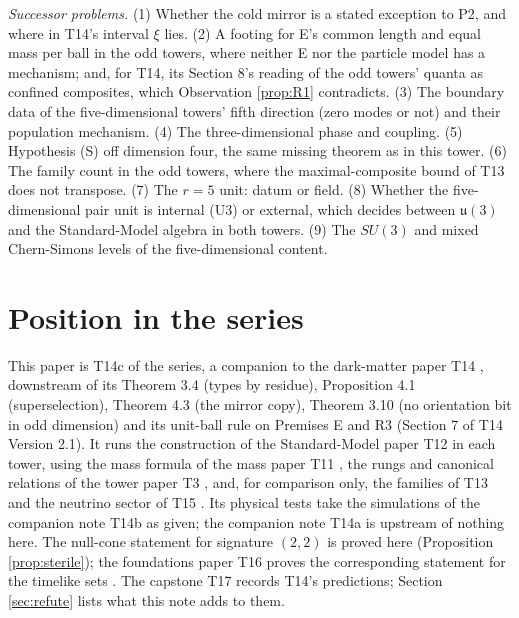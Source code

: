 \documentclass[11pt]{article}
\theoremstyle{definition}
\newcommand{\uu}{\mathfrak{u}}
\begin{document}
\emph{Successor problems.} (1) Whether the cold mirror is a stated exception to P2, and where in T14's interval $\xi$ lies. (2) A footing for E's common length and equal mass per ball in the odd towers, where neither E nor the particle model has a mechanism; and, for T14, its Section 8's reading of the odd towers' quanta as confined composites, which Observation \ref{prop:R1} contradicts. (3) The boundary data of the five-dimensional towers' fifth direction (zero modes or not) and their population mechanism. (4) The three-dimensional phase and coupling. (5) Hypothesis (S) off dimension four, the same missing theorem as in this tower. (6) The family count in the odd towers, where the maximal-composite bound of T13 \cite[Conj.~3.1]{ButlerT13} does not transpose. (7) The $r = 5$ unit: datum or field. (8) Whether the five-dimensional pair unit is internal (U3) or external, which decides between $\uu(3)$ and the Standard-Model algebra in both towers. (9) The $SU(3)$ and mixed Chern-Simons levels of the five-dimensional content.

\section{Position in the series}\label{sec:position}

This paper is T14c of the series, a companion to the dark-matter paper T14 \cite{ButlerT14}, downstream of its Theorem 3.4 (types by residue), Proposition 4.1 (superselection), Theorem 4.3 (the mirror copy), Theorem 3.10 (no orientation bit in odd dimension) and its unit-ball rule on Premises E and R3 (Section 7 of T14 Version 2.1). It runs the construction of the Standard-Model paper T12 \cite{ButlerT12} in each tower, using the mass formula of the mass paper T11 \cite{ButlerT11}, the rungs and canonical relations of the tower paper T3 \cite{ButlerT3}, and, for comparison only, the families of T13 \cite{ButlerT13} and the neutrino sector of T15 \cite{ButlerT15}. Its physical tests take the simulations of the companion note T14b \cite{ButlerT14b} as given; the companion note T14a \cite{ButlerT14a} is upstream of nothing here. The null-cone statement for signature $(2,2)$ is proved here (Proposition \ref{prop:sterile}); the foundations paper T16 proves the corresponding statement for the timelike sets \cite{ButlerT16}. The capstone T17 \cite{ButlerT17} records T14's predictions; Section \ref{sec:refute} lists what this note adds to them.
\end{document}
